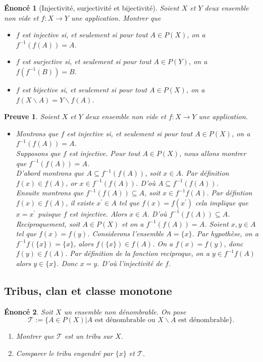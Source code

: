 \documentclass[a4paper, 12pt, french]{article}
\theoremstyle{break}
\newtheorem{enon}{Énoncé}[section]
\newtheorem{preuve}{Preuve}[section]
\begin{document}
\begin{enon}[Injectivité, surjectivité et bijectivité]
	Soient $X$ et $Y$ deux ensemble non vide et $f : X \rightarrow Y$ une application. Montrer que
	\begin{itemize}
		\item[a)] $f$ est injective si, et seulement si pour tout $A \in P(X)$, on a $f^{-1}(f(A)) = A$.
		\item[b)] $f$ est surjective si, et seulement si pour tout $A \in P(Y)$, on a $f(f^{-1}(B)) = B$.
		\item[a)] $f$ est bijective si, et seulement si pour tout $A \in P(X)$, on a $f(X \backslash A)=Y \backslash f(A)$.
	\end{itemize}
\end{enon}

\begin{preuve}
	Soient $X$ et $Y$ deux ensemble non vide et $f : X \rightarrow Y$ une application.
	\begin{itemize}
		\item[a)] Montrons que $f$ est injective si, et seulement si pour tout $A \in P(X)$, on a $f^{-1}(f(A)) = A$.\\
		Supposons que $f$ est injective. Pour tout $A \in P(X)$, nous allons montrer que $f^{-1}(f(A)) = A$.\\
		D'abord montrons que $A \subseteq f^{-1}(f(A))$, soit $x \in A$. Par définition $f(x) \in f(A)$, or $x \in f^{-1}(f(A))$. D'où $A \subseteq f^{-1}(f(A))$.\\ Ensuite montrons que $f^{-1}(f(A)) \subseteq A$, soit $x \in f^{-1}f(A)$. Par défintion $f(x) \in f(A)$, il existe $x^{'} \in A$ tel que $f(x)=f(x^{'})$ cela implique que $x = x^{'}$ puisque $f$ est injective. Alors $x \in A$. D'où $f^{-1}(f(A)) \subseteq A$.\\ Reciproquement, soit $A \in P(X)$ et on a $f^{-1}(f(A)) = A$. Soient $x,y \in A$ tel que $f(x)=f(y)$. Considerons l'ensemble $A=\{x\}$. Par hypothèse, on a $f^{-1}f(\{x\})=\{x\}$, alors $f(\{x\}) \in f(A)$. On a $f(x)=f(y)$, donc $f(y) \in f(A)$. Par définition de la fonction reciproque, on a $y \in f^{-1}f(A)$ alors $y \in \{x\}$. Donc $x=y$. D'où l'injectivité de $f$. \marginpar{$\square$} 
	\end{itemize}
\end{preuve}

\begin{center}\section{Tribus, clan et classe monotone}\end{center}
\begin{enon}
      Soit $X$ un ensemble non dénombrable. On pose $$\mathcal{T}:= \{ A \in P(X) | A \mbox{ est dénombrable ou } X \backslash A \mbox{ est dénombrable}\}.$$
      \begin{enumerate}
              \item Montrer que $\mathcal{T}$ est un tribu sur $X$.
              \item Comparer le tribu engendré par $\{x\}$ et $\mathcal{T}$.
      \end{enumerate}
\end{enon}
\end{document}
